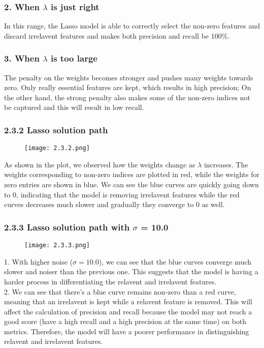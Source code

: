 \documentclass{article}
\begin{document}
\subsubsection*{2. When $\lambda$ is just right} In this range, the Lasso model is able to correctly select the non-zero features and discard irrelavent features and makes both precision and recall be 100\%.
\subsubsection*{3. When $\lambda$ is too large} The penalty on the weights becomes stronger and pushes many weights towards zero. Only really essential features are kept, which results in high precision; 
On the other hand, the strong penalty also makes some of the non-zero indices not be captured and this will result in low recall.

\newpage
\subsubsection*{2.3.2 Lasso solution path}
\begin{figure}[h]
    \centering
    \texttt{[image: 2.3.2.png]}
\end{figure}
As shown in the plot, we observed how the weights change as $\lambda$ increases. The weights corresponding to non-zero indices are plotted in red, while the weights for zero entries are shown in blue.
We can see the blue curves are quickly going down to 0, indicating that the model is removing irrelavent features while the red curves decreases much slower and gradually they converge to 0 as well.

\subsubsection*{2.3.3 Lasso solution path with $\sigma$ = 10.0}
\begin{figure}[h]
    \centering
    \texttt{[image: 2.3.3.png]}
\end{figure}
1. With higher noise ($\sigma = 10.0$), we can see that the blue curves converge much slower and noiser than the previous one.
This suggests that the model is having a harder process in differentiating the relavent and irrelavent features.\\
2. We can see that there's a blue curve remains non-zero than a red curve, meaning that an irrelavent is kept while a relavent feature is removed. This will affect the calculation of precision and recall because the model may not reach a good score (have a high recall and a high precision at the same time) on both metrics. Therefore, the model will have a poorer performance in distinguishing relavent and irrelavent features.
\end{document}
